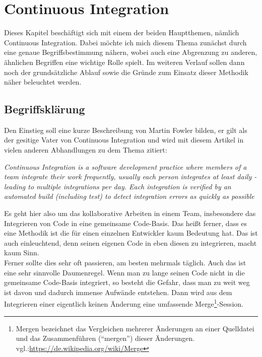 \pagebreak
\chapter{Continuous Integration}
Dieses Kapitel beschäftigt sich mit einem der beiden Hauptthemen, nämlich Continuous Integration. Dabei möchte ich mich diesem Thema zunächst durch eine genaue Begriffsbestimmung nähern, wobei auch eine Abgrenzung zu anderen, ähnlichen Begriffen eine wichtige Rolle spielt. Im weiteren Verlauf sollen dann noch der grundsätzliche Ablauf sowie die Gründe zum Einsatz dieser Methodik näher beleuchtet werden.\\
\section{Begriffsklärung}
Den Einstieg soll eine kurze Beschreibung von Martin Fowler bilden, er gilt als der gesitige Vater von Continuous Integration und wird mit diesem Artikel in vielen anderen Abhandlungen zu dem Thema zitiert:
\begin{center}
	\textit{
	Continuous Integration is a software development practice where members of a team integrate their work frequently, usually each person integrates at least daily - leading to multiple integrations per day. Each integration is verified by an automated build (including test) to detect integration errors as quickly as possible} \cite{fowler-CI}
\end{center}
Es geht hier also um das kollaborative Arbeiten in einem Team, insbesondere das Integrieren von Code in eine gemeinsame Code-Basis. Das heißt ferner, dass es eine Methodik ist die für einen einzelnen Entwickler kaum Bedeutung hat. Das ist auch einleuchtend, denn seinen eigenen Code in eben diesen zu integrieren, macht kaum Sinn. \\
Ferner sollte dies sehr oft passieren, am besten mehrmals täglich. Auch das ist eine sehr sinnvolle Daumenregel. Wenn man zu lange seinen Code nicht in die gemeinsame Code-Basis integriert, so besteht die Gefahr, dass man zu weit weg ist davon und dadurch immense Aufwände entstehen. Dann wird aus dem Integrieren einer eigentlich keinen Änderung eine umfassende Merge\footnote{Mergen bezeichnet das Vergleichen mehrerer Änderungen an einer Quelldatei und das Zusammenführen ("`mergen"') dieser Änderungen. vgl.:\url{https://de.wikipedia.org/wiki/Merge}}-Session.\\
